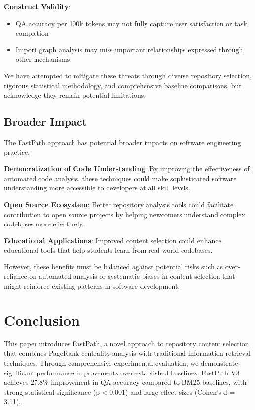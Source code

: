 \documentclass[conference]{IEEEtran}
\begin{document}
\textbf{Construct Validity}:
\begin{itemize}
\item QA accuracy per 100k tokens may not fully capture user satisfaction or task completion
\item Import graph analysis may miss important relationships expressed through other mechanisms
\end{itemize}

We have attempted to mitigate these threats through diverse repository selection, rigorous statistical methodology, and comprehensive baseline comparisons, but acknowledge they remain potential limitations.

\subsection{Broader Impact}

The FastPath approach has potential broader impacts on software engineering practice:

\textbf{Democratization of Code Understanding}: By improving the effectiveness of automated code analysis, these techniques could make sophisticated software understanding more accessible to developers at all skill levels.

\textbf{Open Source Ecosystem}: Better repository analysis tools could facilitate contribution to open source projects by helping newcomers understand complex codebases more effectively.

\textbf{Educational Applications}: Improved content selection could enhance educational tools that help students learn from real-world codebases.

However, these benefits must be balanced against potential risks such as over-reliance on automated analysis or systematic biases in content selection that might reinforce existing patterns in software development.

\section{Conclusion}

This paper introduces FastPath, a novel approach to repository content selection that combines PageRank centrality analysis with traditional information retrieval techniques. Through comprehensive experimental evaluation, we demonstrate significant performance improvements over established baselines: FastPath V3 achieves 27.8\% improvement in QA accuracy compared to BM25 baselines, with strong statistical significance (p < 0.001) and large effect sizes (Cohen's d = 3.11).
\end{document}
